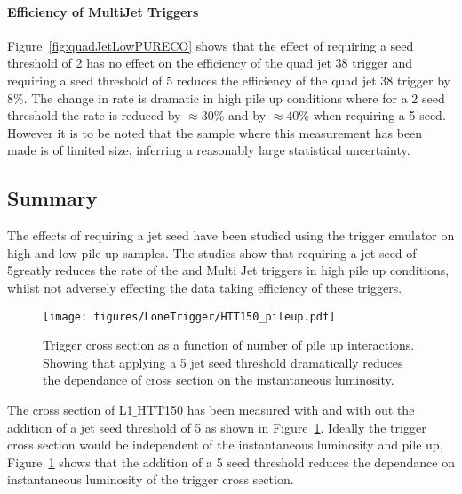 \paragraph{Efficiency of MultiJet Triggers} %
\label{par:Efficiency of MultiJet Triggers}
Figure~\ref{fig:quadJetLowPURECO} shows that the effect of requiring a seed 
threshold of \unit{2}{\GeV} has no effect on the efficiency of the quad jet 
\unit{38}{\GeV} trigger and requiring a seed threshold of \unit{5}{\GeV} 
reduces the efficiency of the quad jet 38 trigger by $8\%$. The change in rate 
is dramatic in high pile up conditions where for a \unit{2}{\GeV} seed 
threshold the rate is reduced by $\approx 30\%$ and by $\approx 40\%$ when 
requiring a \unit{5}{\GeV} seed. However it is to be noted that the sample 
where this measurement has been made is of limited size, inferring a reasonably 
large statistical uncertainty. 



\subsection{Summary} %
\label{sec:Summary}
The effects of requiring a jet seed have been studied using the \Lone trigger 
emulator on high and low pile-up samples. The studies show that requiring a jet 
seed of 5\GeV greatly reduces the rate of the \HT and Multi Jet triggers in 
high pile up conditions, whilst not adversely effecting the data taking 
efficiency of these triggers.

\begin{figure}[ht]
  \centering
  \texttt{[image: figures/LoneTrigger/HTT150\_pileup.pdf]}
  \caption{Trigger cross section as a function of number of pile up 
  interactions. Showing that applying a \unit{5}{\GeV} jet seed threshold 
  dramatically reduces the dependance of cross section on the instantaneous   
  luminosity.}
  \label{fig:figures_HTT150_pileup}
\end{figure}

The cross section of L1$\_$HTT150 has been measured with and with out the 
addition of a jet seed threshold of \unit{5}{\GeV} as shown in  
Figure~\ref{fig:figures_HTT150_pileup}. Ideally the trigger cross section would 
be independent of the instantaneous luminosity and pile up, 
Figure~\ref{fig:figures_HTT150_pileup} shows that the addition of a 
\unit{5}{\GeV} seed threshold reduces the dependance on instantaneous 
luminosity of the trigger cross section.


